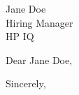 \documentclass[12pt,letter]{letter}
\def\hm{Jane Doe} %
\def\company{HP IQ}
\begin{document}
\begin{letter}{\hm \\ Hiring Manager \\ \company}

\opening{Dear \hm,}






\closing{Sincerely,}

\end{letter}
\end{document}
